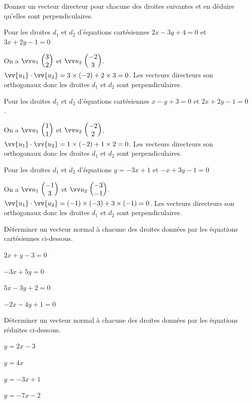 \documentclass[11pt,a4paper]{article}  %
\begin{document}
Donner un vecteur directeur pour chacune des droites suivantes et en déduire qu'elles sont perpendiculaires.
\begin{enumMet}
	\item Pour les droites $d_1$ et $d_2$ d'équations cartésiennes $2 x-3 y+4=0$ et $3 x+2 y-1=0$
	\begin{corrBox}
		On a $\Coord{u_1}{3}{2}$ et $\Coord{u_2}{-2}{3}$.\\
		$\vv{u_1}\cdot\vv{u_2}=3\times(-2)+2\times3=0$.
		Les vecteurs directeurs son orthogonaux donc les droites $d_1$ et $d_2$ sont perpendiculaires.
	\end{corrBox}
	\item Pour les droites $d_1$ et $d_2$ d'équations cartésiennes $x-y+3=0$ et $2 x+2 y-1=0$.
	\begin{corrBox}
	On a $\Coord{u_1}{1}{1}$ et $\Coord{u_2}{-2}{2}$.\\
	$\vv{u_1}\cdot\vv{u_2}=1\times(-2)+1\times2=0$.
	Les vecteurs directeurs son orthogonaux donc les droites $d_1$ et $d_2$ sont perpendiculaires.
	\end{corrBox}
	\item Pour les droites $d_1$ et $d_2$ d'équations $y=-3 x+1$ et $-x+3 y-1=0$
	\begin{corrBox}
		On a $\Coord{u_1}{-1}{3}$ et $\Coord{u_2}{-3}{-1}$.\\
		$\vv{u_1}\cdot\vv{u_2}=(-1)\times(-3)+3\times(-1)=0$.
		Les vecteurs directeurs son orthogonaux donc les droites $d_1$ et $d_2$ sont perpendiculaires.
	\end{corrBox}
\end{enumMet}



\exerciceDS{}

Déterminer un vecteur normal à chacune des droites données par les équations cartésiennes ci-dessous.
\begin{enumMet}
	\item $2 x+y-3=0$ \quad \quad {}
	\item $-3 x+5 y=0$ \quad \quad {}
	\item $5 x-3 y+2=0$ \quad \quad {}
	\item $-2 x-4 y+1=0$ \quad \quad {}
\end{enumMet}

\exerciceDS{}

Déterminer un vecteur normal à chacune des droites données par les équations réduites ci-dessous.
\begin{enumMet}
	\item $y=2 x-3$ \quad \quad {}
	\item $y=4 x$ \quad \quad {}
	\item $y=-3 x+1$ \quad \quad {}
	\item $y=-7 x-2$ \quad \quad {}
\end{enumMet}
\end{document}
